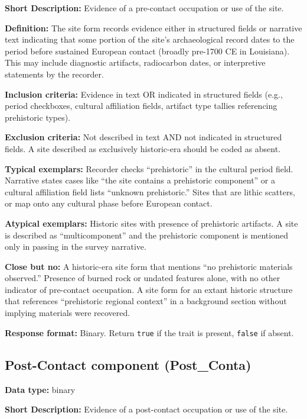 \documentclass[
]{article}
\begin{document}
\textbf{Short Description:} Evidence of a pre-contact occupation or use
of the site.

\textbf{Definition:} The site form records evidence either in structured
fields or narrative text indicating that some portion of the site's
archaeological record dates to the period before sustained European
contact (broadly pre-1700 CE in Louisiana). This may include diagnostic
artifacts, radiocarbon dates, or interpretive statements by the
recorder.

\textbf{Inclusion criteria:} Evidence in text OR indicated in structured
fields (e.g., period checkboxes, cultural affiliation fields, artifact
type tallies referencing prehistoric types).

\textbf{Exclusion criteria:} Not described in text AND not indicated in
structured fields. A site described as exclusively historic-era should
be coded as absent.

\textbf{Typical exemplars:} Recorder checks ``prehistoric'' in the
cultural period field. Narrative states cases like ``the site contains a
prehistoric component'' or a cultural affiliation field lists ``unknown
prehistoric.'' Sites that are lithic scatters, or map onto any cultural
phase before European contact.

\textbf{Atypical exemplars:} Historic sites with presence of prehistoric
artifacts. A site is described as ``multicomponent'' and the prehistoric
component is mentioned only in passing in the survey narrative.

\textbf{Close but no:} A historic-era site form that mentions ``no
prehistoric materials observed.'' Presence of burned rock or undated
features alone, with no other indicator of pre-contact occupation. A
site form for an extant historic structure that references ``prehistoric
regional context'' in a background section without implying materials
were recovered.

\textbf{Response format:} Binary. Return \texttt{true} if the trait is
present, \texttt{false} if absent.

\subsection{Post-Contact component
(Post\_Conta)}\label{post-contact-component-post_conta}

\textbf{Data type:} binary

\textbf{Short Description:} Evidence of a post-contact occupation or use
of the site.
\end{document}
